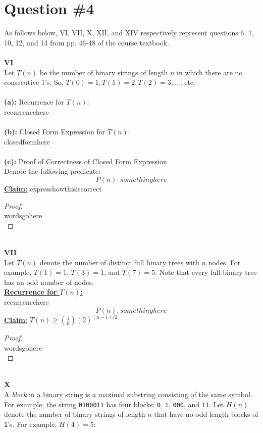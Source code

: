 \documentclass[12pt]{article}
\begin{document}
\section*{Question \#4}
As follows below, VI, VII, X, XII, and XIV respectively represent questions 6, 7, 10, 12, and 14 from pp. 46-48 of the course textbook. \\
\\
\textbf{VI} \\
Let $T(n)$ be the number of binary strings of length $n$ in which there are no consecutive $1$'s. So, \(T(0) = 1, T(1) = 2, T(2) = 3, ...\), etc. \\
\\
\textbf{(a):} Recurrence for $T(n)$: \\
recurrencehere \\
\\
\textbf{(b):} Closed Form Expression for $T(n)$: \\
closedformhere \\
\\
\textbf{(c):} Proof of Correctness of Closed Form Expression \\
Denote the following predicate: \\
\[P(n): somethinghere\]
\textbf{\underline{Claim:}} expresshowthisiscorrect
\begin{proof}
\leavevmode\\
    wordsgohere \\
\end{proof}
\leavevmode\\
\textbf{VII} \\
Let $T(n)$ denote the number of distinct full binary trees with $n$ nodes. For example, $T(1) = 1$, $T(3) = 1$, and $T(7) = 5$. Note that every full binary tree has an odd number of nodes. \\
\textbf{\underline{Recurrence for $T(n)$:}} \\
recurrencehere \\
\[P(n): somethinghere\]
\large \textbf{\underline {Claim:}} \(T(n) \geq (\frac{1}{n})(2)^{(n - 1) / 2}\)
\normalsize
\begin{proof}
\leavevmode\\
    wordsgohere \\
\end{proof}
\leavevmode\\
\textbf{X} \\
A \textit{block} in a binary string is a maximal substring consisting of the same symbol. For example, the string \texttt{0100011} has four blocks: \texttt{0}, \texttt{1}, \texttt{000}, and \texttt{11}. Let $H(n)$ denote the number of binary strings of length $n$ that have no odd length blocks of \texttt{1}'s. For example, $H(4) = 5$:
\end{document}
